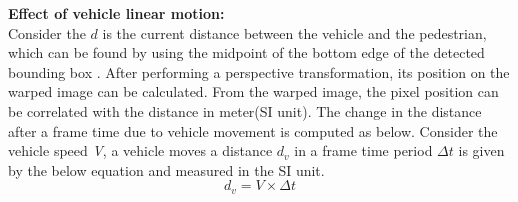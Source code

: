 







\textbf{Effect of vehicle linear motion:} \\
Consider the $d$ is the current distance between the vehicle and the pedestrian, which can be found by using the midpoint of the bottom edge of the detected bounding box \cite{CarND-Advanced-Lane}. After performing a perspective transformation, its position on the warped image can be calculated. From the warped image, the pixel position can be correlated with the distance in meter(SI unit). The change in the distance after a frame time due to vehicle movement is computed as below. Consider the vehicle speed \textit{V}, a vehicle moves a distance $d_v$ in a frame time period $\Delta t$ is given by the below equation and measured in the SI unit.
\begin{equation} \label{distance-in-pixel}
{d_v}= V \times \Delta t
\end{equation} 


